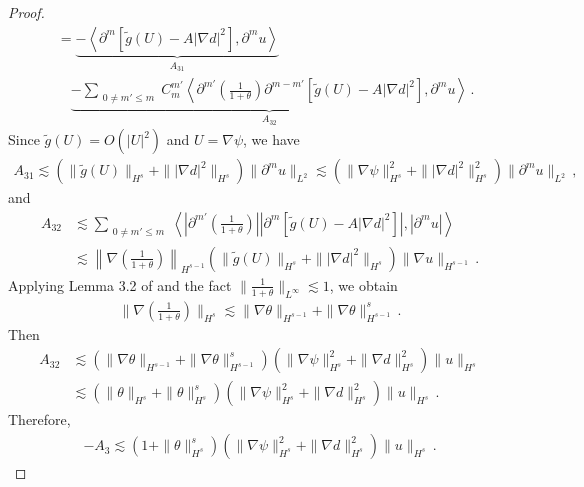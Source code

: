 \documentclass[reqno,11pt]{amsart}
\numberwithin{equation}{section}
\begin{document}
\begin{proof}
\begin{equation*}
\begin{aligned}
&= \underbrace{ -\left\langle \partial^m \left[ \tilde{g}(U) - A|\nabla d|^2 \right], \partial^m u \right\rangle}_{A_{31}} \\
&\quad \underbrace{ -\sum_{\substack{0 \neq m' \leq m}} C_m^{m'} \left\langle \partial^{m'} \left( \frac{1}{1+\theta} \right) \partial^{m - m'} \left[ \tilde{g}(U) - A|\nabla d|^2 \right], \partial^m u \right\rangle }_{A_{32}} \,.
\end{aligned}
\end{equation*}
Since $\tilde{g}(U) = O(|U|^2)$ and $U = \nabla \psi$, we have
\begin{equation*}
\begin{aligned}
A_{31} \lesssim\left( \|\tilde{g}(U)\|_{H^s} + \| |\nabla d|^2 \|_{H^s} \right) \|\partial^m u\|_{L^2} \lesssim \left( \|\nabla \psi\|_{H^s}^2 + \| |\nabla d|^2 \|^2_{H^s} \right) \|\partial^m u\|_{L^2} \,,
\end{aligned}
\end{equation*}
and
\begin{equation*}
\begin{aligned}
A_{32}&\lesssim\sum_{\substack{0 \neq m' \leq m}} \left\langle \left| \partial^{m'} \left( \frac{1}{1+\theta} \right) \right| \left| \partial^{m} \left[ \tilde{g}(U) - A|\nabla d|^2 \right] \right|, |\partial^m u| \right\rangle\\&
\lesssim \left\| \nabla \left( \frac{1}{1+\theta} \right) \right\|_{H^{s-1}} \left( \|\tilde{g}(U)\|_{H^s} + \| |\nabla d|^2 \|_{H^s} \right) \|\nabla u\|_{H^{s-1}} \,.
\end{aligned}
\end{equation*}
Applying Lemma 3.2 of \cite{JLT-M3AS-2020} and the fact $\|\frac{1}{1+\theta}\|_{L^\infty}\lesssim 1$, we obtain 
\begin{equation*}
\begin{aligned}
\|\nabla (\frac{1}{1+\theta})\|_{H^s}\lesssim\|\nabla\theta\|_{H^{s-1}}+\|\nabla \theta\|^s
_{H^{s-1}} \,.
\end{aligned}
\end{equation*}
Then 
\begin{equation*}
\begin{aligned}
A_{32}&\lesssim(\|\nabla\theta\|_{H^{s-1}}+\|\nabla \theta\|^s_{H^{s-1}})(\|\nabla\psi\|^2_{H^s}+\|\nabla d\|^2_{H^s})\|u\|_{H^s}\\&
\lesssim(\|\theta\|_{H^{s}}+\| \theta\|^s_{H^{s}})(\|\nabla\psi\|^2_{H^s}+\|\nabla d\|^2_{H^s})\|u\|_{H^s} \,.
\end{aligned}
\end{equation*}
Therefore,
\begin{equation}\label{u-eq4}
\begin{aligned}
 - A_3 \lesssim(1+\| \theta\|^s_{H^{s}})(\|\nabla\psi\|^2_{H^s}+\|\nabla d\|^2_{H^s})\|u\|_{H^s} \,.
\end{aligned}
\end{equation}


\end{proof}
\end{document}
